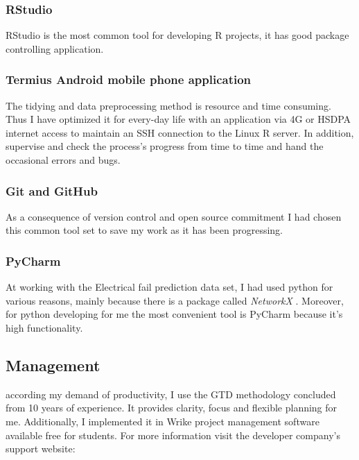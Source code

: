 			\subsubsection{RStudio}
RStudio is the most common tool for developing R projects, it has good package controlling application.
\cite{RStudio}
			\subsubsection{Termius Android mobile phone application}
The tidying and data preprocessing method is resource and time consuming. Thus I have optimized it for every-day life with an application via 4G or HSDPA internet access to maintain an SSH connection to the Linux R server. In addition, supervise and check the process's progress from time to time and hand the occasional errors and bugs.
\cite{Termius}
			\subsubsection{Git and GitHub}
As a consequence of version control and open source commitment I had chosen this common tool set to save my work as it has been progressing.
\cite{Github}
			\subsubsection{PyCharm}
At working with the Electrical fail prediction data set, I had used python for various reasons, mainly because there is a package called \textit{NetworkX} \cite{NetworkX}. Moreover, for python developing for me the most convenient tool is PyCharm because it's high functionality.
\cite{PyCharm}	
		\subsection{Management}
according my demand of productivity, I use the GTD\cite{GTD} methodology concluded from 10 years of experience. It provides clarity, focus and flexible planning for me. Additionally, I implemented it in Wrike \cite{WRIKE} project management software available free for students. For more information visit the developer company's support website: \cite{WRIKE_for_students}
